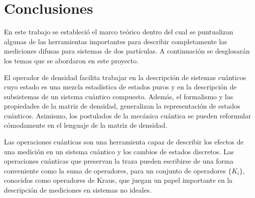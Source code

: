 \chapter{Conclusiones }

En este trabajo se estableció el marco teórico dentro del cual se puntualizan
algunas de las herramientas importantes para describir completamente las
mediciones difusas para sistemas de dos partículas. A continuación se desglosarán los temas que se abordaron en este proyecto.  


El operador de densidad facilita trabajar en la descripción de sistemas cuánticos cuyo estado es una mezcla estadística de estados puros y en la descripción de subsistemas de un sistema cuántico compuesto. Además, el formalismo y las propiedades de la matriz de densidad, generalizan la representación de estados cuánticos. Asimismo, los postulados de la mecánica cuántica se pueden reformular cómodamente en el lenguaje de la matriz de densidad.

Las operaciones cuánticas %
son una herramienta  
capaz de describir los efectos de una medición en un sistema cuántico y los cambios
de estados discretos. 
Las operaciones cuánticas que preservan la traza pueden escribirse de una forma conveniente como la suma de operadores, para un conjunto de operadores $\{K_i\}$, conocidos como operadores de Kraus, que juegan un papel importante en la descripción de mediciones en sistemas no ideales. 

